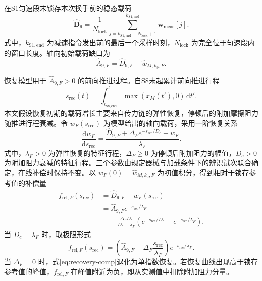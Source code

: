 \documentclass{JQR_LaTeX_Template-0507/JQRnew}
\begin{document}
在S1匀速段末锁存本次换手前的稳态载荷
\begin{equation}
\label{eq:lock}
\widehat{\bm D}_9=\frac{1}{N_{\mathrm{lock}}}
\sum_{j=k_{\mathrm{S1,end}}-N_{\mathrm{lock}}+1}^{k_{\mathrm{S1,end}}}
\bm w_{\mathrm{meas}}[j].
\end{equation}
式中，$k_{\mathrm{S1,end}}$ 为减速指令发出前的最后一个采样时刻，$N_{\mathrm{lock}}$ 为完全位于匀速段内的窗口长度。轴向初始载荷缺口为
\begin{equation}
\label{eq:deficit}
\widehat A_{9,F}=\widehat D_{9,F}-\widehat w_{M,k_9,F}.
\end{equation}

恢复模型用于 $\widehat A_{9,F}>0$ 的前向推进过程。自S8末起累计前向推进行程
\begin{equation}
\label{eq:recovery-travel}
s_{\mathrm{rec}}(t)=\int_{t_{\mathrm{S8,end}}}^{t}
\max\!\left(\dot x_M(t'),0\right)\,\mathrm dt'.
\end{equation}
本文假设恢复初期的载荷增长主要来自传力链的弹性恢复，停顿后的附加摩擦阻力随推进行程衰减。令 $w_F(s_{\mathrm{rec}})$ 为模型给出的轴向载荷，采用一阶恢复关系
\begin{equation}
\label{eq:recovery-ode}
\frac{\mathrm dw_F}{\mathrm ds_{\mathrm{rec}}}
=\frac{\widehat D_{9,F}+\Delta_F e^{-s_{\mathrm{rec}}/D_c}-w_F}{\lambda_F}.
\end{equation}
式中，$\lambda_F>0$ 为弹性恢复的特征行程，$\Delta_F\ge0$ 为停顿后附加阻力的幅值，$D_c>0$ 为附加阻力衰减的特征行程。三个参数由规定器械与加载条件下的辨识试次联合确定，在线补偿时保持不变。以 $w_F(0)=\widehat w_{M,k_9,F}$ 为初值积分，得到相对于锁存参考值的补偿量
\begin{equation}
\label{eq:recovery-comp}
\begin{aligned}
f_{\mathrm{rel},F}(s_{\mathrm{rec}})&=\widehat D_{9,F}-w_F(s_{\mathrm{rec}})\\
&=\widehat A_{9,F}e^{-s_{\mathrm{rec}}/\lambda_F}\\
&\quad-\frac{\Delta_FD_c}{D_c-\lambda_F}
\left(e^{-s_{\mathrm{rec}}/D_c}-e^{-s_{\mathrm{rec}}/\lambda_F}\right).
\end{aligned}
\end{equation}
当 $D_c=\lambda_F$ 时，取极限形式
\begin{equation}
\label{eq:equal-scales}
f_{\mathrm{rel},F}(s_{\mathrm{rec}})=
\left(\widehat A_{9,F}-\Delta_F\frac{s_{\mathrm{rec}}}{\lambda_F}\right)e^{-s_{\mathrm{rec}}/\lambda_F}.
\end{equation}
当 $\Delta_F=0$ 时，式\eqref{eq:recovery-comp}退化为单指数恢复。若恢复曲线出现高于锁存参考值的峰值，$f_{\mathrm{rel},F}$ 在峰值附近为负，即从实测值中扣除附加阻力分量。
\end{document}
